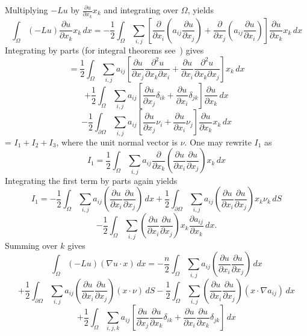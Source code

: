 Multiplying $-Lu$ by $\frac{\partial u}{\partial x_k} x_k$ and integrating
over $\Omega$, yields
$$\int_{\Omega}(-Lu)\frac{\partial u}{\partial x_k} x_k \, dx=
-\frac{1}{2} \int_{\Omega}
\sum_{i,j}\left[
\frac{\partial}{\partial x_i}
\left( a_{ij} \frac{\partial u}{\partial x_j} \right) +
\frac{\partial}{\partial x_j}
\left( a_{ij} \frac{\partial u}{\partial x_i} \right)
\right]
\frac{\partial u}{\partial x_k} x_k \, dx$$
Integrating by parts (for integral theorems see~\cite[p. 20]
{zeidler:nfa88IIa})
gives
$$= \frac{1}{2} \int_{\Omega}
\sum_{i,j} a_{ij} \left[
\frac{\partial u}{\partial x_j}
\frac{\partial^2 u}{\partial x_k\partial x_i} +
\frac{\partial u}{\partial x_i}
\frac{\partial^2 u}{\partial x_k\partial x_j}
\right] x_k \, dx
$$
$$
+
\frac{1}{2} \int_{\Omega}
\sum_{i,j} a_{ij} \left[
\frac{\partial u}{\partial x_j} \delta_{ik} +
\frac{\partial u}{\partial x_i} \delta_{jk}
\right] \frac{\partial u}{\partial x_k} \, dx
$$
$$- \frac{1}{2} \int_{\partial\Omega}
\sum_{i,j} a_{ij} \left[
\frac{\partial u}{\partial x_j} \nu_{i} +
\frac{\partial u}{\partial x_i} \nu_{j}
\right] \frac{\partial u}{\partial x_k} x_k \, dx
$$
= $I_1 + I_2 + I_3$, where the unit normal vector is $\nu$.
One may rewrite $I_1$ as
$$I_1 = \frac{1}{2} \int_{\Omega}
\sum_{i,j} a_{ij} \frac{\partial}{\partial x_k}\left(
\frac{\partial u}{\partial x_i}
\frac{\partial u}{\partial x_j}
\right) x_k \, dx
$$
Integrating the first term by parts again yields
$$I_1 = -\frac{1}{2} \int_{\Omega}
\sum_{i,j} a_{ij} \left(
\frac{\partial u}{\partial x_i}
\frac{\partial u}{\partial x_j}
\right) \, dx
+
\frac{1}{2} \int_{\partial\Omega}
\sum_{i,j} a_{ij} \left(
\frac{\partial u}{\partial x_i}
\frac{\partial u}{\partial x_j}
\right) x_k \nu_k \, dS
$$
$$
-
\frac{1}{2} \int_{\Omega}
\sum_{i,j} \left(
\frac{\partial u}{\partial x_i}
\frac{\partial u}{\partial x_j}
\right) x_k \frac{\partial a_{ij}}{\partial x_k}\, dx.
$$
Summing over $k$ gives
$$\int_{\Omega}(-Lu)(\nabla u\cdot x)\, dx =
-\frac{n}{2} \int_{\Omega}
\sum_{i,j} a_{ij} \left(
\frac{\partial u}{\partial x_i}
\frac{\partial u}{\partial x_j}
\right) \, dx
$$
$$
+
\frac{1}{2} \int_{\partial\Omega}
\sum_{i,j} a_{ij} \left(
\frac{\partial u}{\partial x_i}
\frac{\partial u}{\partial x_j}
\right) (x\cdot \nu ) \, dS
-
\frac{1}{2} \int_{\Omega}
\sum_{i,j} \left(
\frac{\partial u}{\partial x_i}
\frac{\partial u}{\partial x_j}
\right) (x\cdot  \nabla a_{ij}) \, dx
$$
$$
+
\frac{1}{2} \int_{\Omega}
\sum_{i,j,k} a_{ij} \left[
\frac{\partial u}{\partial x_j}
\frac{\partial u}{\partial x_k} \delta_{ik} +
\frac{\partial u}{\partial x_i}
\frac{\partial u}{\partial x_k} \delta_{jk}
\right] \, dx
$$
